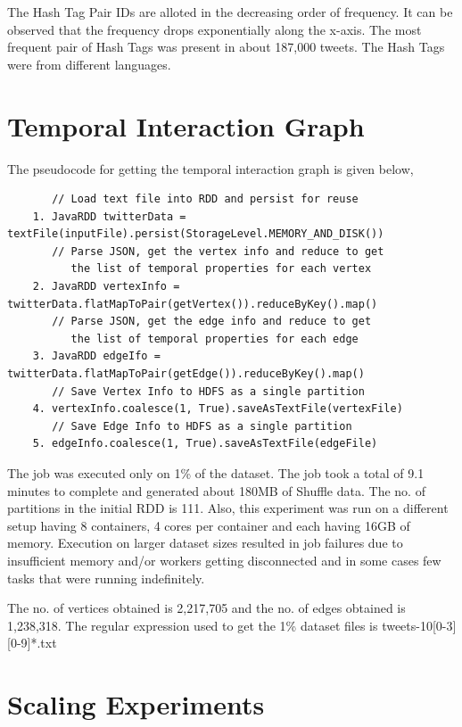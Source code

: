 \documentclass[11pt,a4paper,oneside]{article}
\begin{document}
    The Hash Tag Pair IDs are alloted in the decreasing order of frequency. It can be observed that the frequency drops exponentially along the x-axis. The most frequent pair of Hash Tags was present in about 187,000 tweets. The Hash Tags were from different languages.
    
    \section{Temporal Interaction Graph}
    
    The pseudocode for getting the temporal interaction graph is given below,
    
    \begin{verbatim} 
       // Load text file into RDD and persist for reuse
    1. JavaRDD twitterData = textFile(inputFile).persist(StorageLevel.MEMORY_AND_DISK())
       // Parse JSON, get the vertex info and reduce to get
          the list of temporal properties for each vertex
    2. JavaRDD vertexInfo = twitterData.flatMapToPair(getVertex()).reduceByKey().map()
       // Parse JSON, get the edge info and reduce to get
          the list of temporal properties for each edge
    3. JavaRDD edgeIfo = twitterData.flatMapToPair(getEdge()).reduceByKey().map()
       // Save Vertex Info to HDFS as a single partition
    4. vertexInfo.coalesce(1, True).saveAsTextFile(vertexFile)
       // Save Edge Info to HDFS as a single partition
    5. edgeInfo.coalesce(1, True).saveAsTextFile(edgeFile)     
    \end{verbatim}
    
    The job was executed only on 1\% of the dataset. The job took a total of 9.1 minutes to complete and generated about 180MB of Shuffle data. The no. of partitions in the initial RDD is 111. Also, this experiment was run on a different setup having 8 containers, 4 cores per container and each having 16GB of memory. Execution on larger dataset sizes resulted in job failures due to insufficient memory and/or workers getting disconnected and in some cases few tasks that were running indefinitely. 
    
    The no. of vertices obtained is 2,217,705 and the no. of edges obtained is 1,238,318. The regular expression used to get the 1\% dataset files is tweets-10[0-3][0-9]*.txt 
    
    \section{Scaling Experiments}
    
\end{document}
